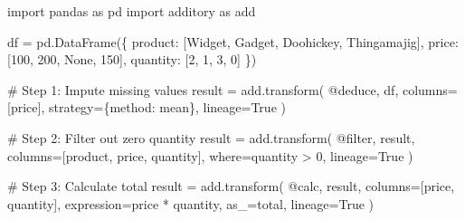 \documentclass[
  letterpaper,
]{scrbook}
\newenvironment{Shaded}{\begin{snugshade}}{\end{snugshade}}
\newcommand{\CommentTok}[1]{\textcolor[rgb]{0.37,0.37,0.37}{#1}}
\newcommand{\DecValTok}[1]{\textcolor[rgb]{0.68,0.00,0.00}{#1}}
\newcommand{\ImportTok}[1]{\textcolor[rgb]{0.00,0.46,0.62}{#1}}
\newcommand{\NormalTok}[1]{\textcolor[rgb]{0.00,0.23,0.31}{#1}}
\newcommand{\OperatorTok}[1]{\textcolor[rgb]{0.37,0.37,0.37}{#1}}
\newcommand{\StringTok}[1]{\textcolor[rgb]{0.13,0.47,0.30}{#1}}
\newcommand{\VariableTok}[1]{\textcolor[rgb]{0.07,0.07,0.07}{#1}}
\begin{document}
\begin{Shaded}
\begin{Highlighting}[]
\ImportTok{import}\NormalTok{ pandas }\ImportTok{as}\NormalTok{ pd}
\ImportTok{import}\NormalTok{ additory }\ImportTok{as}\NormalTok{ add}

\NormalTok{df }\OperatorTok{=}\NormalTok{ pd.DataFrame(\{}
    \StringTok{\textquotesingle{}product\textquotesingle{}}\NormalTok{: [}\StringTok{\textquotesingle{}Widget\textquotesingle{}}\NormalTok{, }\StringTok{\textquotesingle{}Gadget\textquotesingle{}}\NormalTok{, }\StringTok{\textquotesingle{}Doohickey\textquotesingle{}}\NormalTok{, }\StringTok{\textquotesingle{}Thingamajig\textquotesingle{}}\NormalTok{],}
    \StringTok{\textquotesingle{}price\textquotesingle{}}\NormalTok{: [}\DecValTok{100}\NormalTok{, }\DecValTok{200}\NormalTok{, }\VariableTok{None}\NormalTok{, }\DecValTok{150}\NormalTok{],}
    \StringTok{\textquotesingle{}quantity\textquotesingle{}}\NormalTok{: [}\DecValTok{2}\NormalTok{, }\DecValTok{1}\NormalTok{, }\DecValTok{3}\NormalTok{, }\DecValTok{0}\NormalTok{]}
\NormalTok{\})}

\CommentTok{\# Step 1: Impute missing values}
\NormalTok{result }\OperatorTok{=}\NormalTok{ add.transform(}
    \StringTok{\textquotesingle{}@deduce\textquotesingle{}}\NormalTok{,}
\NormalTok{    df,}
\NormalTok{    columns}\OperatorTok{=}\NormalTok{[}\StringTok{\textquotesingle{}price\textquotesingle{}}\NormalTok{],}
\NormalTok{    strategy}\OperatorTok{=}\NormalTok{\{}\StringTok{\textquotesingle{}method\textquotesingle{}}\NormalTok{: }\StringTok{\textquotesingle{}mean\textquotesingle{}}\NormalTok{\},}
\NormalTok{    lineage}\OperatorTok{=}\VariableTok{True}
\NormalTok{)}

\CommentTok{\# Step 2: Filter out zero quantity}
\NormalTok{result }\OperatorTok{=}\NormalTok{ add.transform(}
    \StringTok{\textquotesingle{}@filter\textquotesingle{}}\NormalTok{,}
\NormalTok{    result,}
\NormalTok{    columns}\OperatorTok{=}\NormalTok{[}\StringTok{\textquotesingle{}product\textquotesingle{}}\NormalTok{, }\StringTok{\textquotesingle{}price\textquotesingle{}}\NormalTok{, }\StringTok{\textquotesingle{}quantity\textquotesingle{}}\NormalTok{],}
\NormalTok{    where}\OperatorTok{=}\StringTok{\textquotesingle{}quantity \textgreater{} 0\textquotesingle{}}\NormalTok{,}
\NormalTok{    lineage}\OperatorTok{=}\VariableTok{True}
\NormalTok{)}

\CommentTok{\# Step 3: Calculate total}
\NormalTok{result }\OperatorTok{=}\NormalTok{ add.transform(}
    \StringTok{\textquotesingle{}@calc\textquotesingle{}}\NormalTok{,}
\NormalTok{    result,}
\NormalTok{    columns}\OperatorTok{=}\NormalTok{[}\StringTok{\textquotesingle{}price\textquotesingle{}}\NormalTok{, }\StringTok{\textquotesingle{}quantity\textquotesingle{}}\NormalTok{],}
\NormalTok{    expression}\OperatorTok{=}\StringTok{\textquotesingle{}price * quantity\textquotesingle{}}\NormalTok{,}
\NormalTok{    as\_}\OperatorTok{=}\StringTok{\textquotesingle{}total\textquotesingle{}}\NormalTok{,}
\NormalTok{    lineage}\OperatorTok{=}\VariableTok{True}
\NormalTok{)}


\end{Highlighting}
\end{Shaded}
\end{document}
